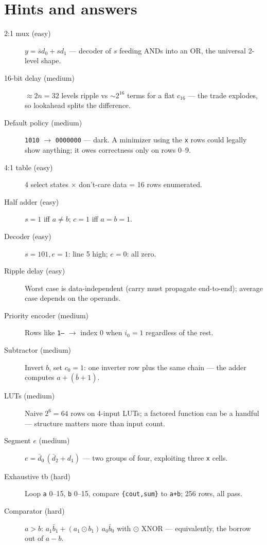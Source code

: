 \section*{Hints and answers}
\begin{description}
\item[2:1 mux (easy)] $y=\bar s d_0 + s d_1$ — decoder of $s$ feeding
ANDs into an OR, the universal 2-level shape.
\item[16-bit delay (medium)] $\approx 2n=32$ levels ripple vs
$\sim 2^{16}$ terms for a flat $c_{16}$ — the trade explodes, so lookahead
splits the difference.
\item[Default policy (medium)] \texttt{1010} $\to$ \texttt{0000000} —
dark. A minimizer using the \texttt{x} rows could legally show
anything; it owes correctness only on rows 0--9.
\item[4:1 table (easy)] 4 select states $\times$ don't-care data = 16
rows enumerated.
\item[Half adder (easy)] $s=1$ iff $a\ne b$; $c=1$ iff $a=b=1$.
\item[Decoder (easy)] $s=101,e=1$: line 5 high; $e=0$: all zero.
\item[Ripple delay (easy)] Worst case is data-independent (carry must
propagate end-to-end); average case depends on the operands.
\item[Priority encoder (medium)] Rows like \texttt{1---} $\to$ index 0
when $i_0=1$ regardless of the rest.
\item[Subtractor (medium)] Invert $b$, set $c_0=1$: one inverter row
plus the same chain — the adder computes $a+(\bar b+1)$.
\item[LUTs (medium)] Naive $2^6=64$ rows on 4-input LUTs; a factored
function can be a handful — structure matters more than input count.
\item[Segment $e$ (medium)] $e = \bar d_0\,(\bar d_2 + d_1)$ — two
groups of four, exploiting three \texttt{x} cells.
\item[Exhaustive tb (hard)] Loop \texttt{a} 0--15, \texttt{b} 0--15,
compare \texttt{\{cout,sum\}} to \texttt{a+b}; 256 rows, all pass.
\item[Comparator (hard)] $a>b$: $a_1\bar b_1 +
(a_1 \odot b_1)\,a_0\bar b_0$ with $\odot$ XNOR — equivalently, the
borrow out of $a-b$.
\end{description}
